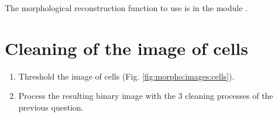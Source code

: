 \begin{pcomment}
\begin{premark}
The morphological reconstruction function to use is 
 in the module .
\end{premark}
\end{pcomment}


\section{Cleaning of the image of cells}
\begin{qbox}
\begin{enumerate}
\item Threshold the image of cells (Fig. \ref{fig:morpho:images:cells}).
\item Process the resulting binary image with the 3 cleaning processes of the previous question.
\end{enumerate}
\end{qbox}

